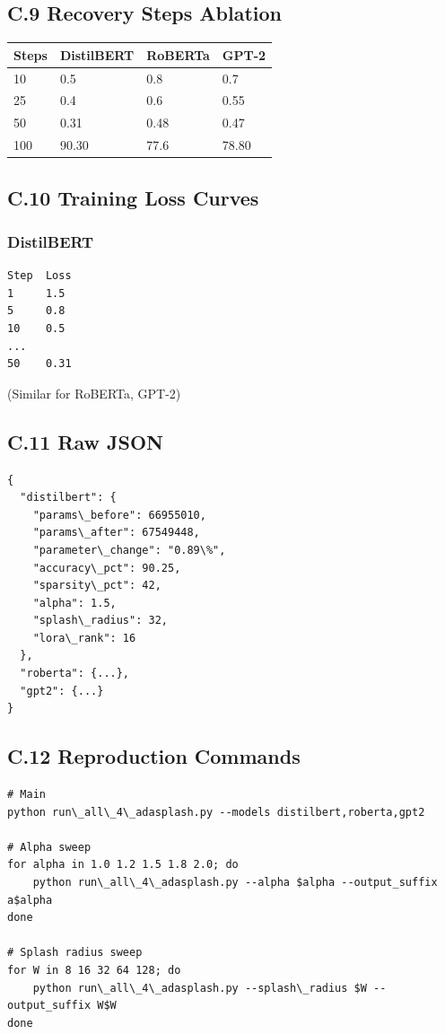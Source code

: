 \subsection{C.9 Recovery Steps Ablation}

\begin{table}[H]
\centering
\small
\begin{tabular}{llll}
\toprule
\textbf{Steps} & \textbf{DistilBERT} & \textbf{RoBERTa} & \textbf{GPT-2} \\
\midrule
10 & 0.5 & 0.8 & 0.7 \\
25 & 0.4 & 0.6 & 0.55 \\
50 & 0.31 & 0.48 & 0.47 \\
100 & 90.30 & 77.6 & 78.80 \\
\bottomrule
\end{tabular}
\end{table}

\subsection{C.10 Training Loss Curves}

\subsubsection{DistilBERT}
\begin{lstlisting}
Step  Loss
1     1.5
5     0.8
10    0.5
...
50    0.31
\end{lstlisting}

(Similar for RoBERTa, GPT-2)

\subsection{C.11 Raw JSON}

\begin{lstlisting}
{
  "distilbert": {
    "params\_before": 66955010,
    "params\_after": 67549448,
    "parameter\_change": "0.89\%",
    "accuracy\_pct": 90.25,
    "sparsity\_pct": 42,
    "alpha": 1.5,
    "splash\_radius": 32,
    "lora\_rank": 16
  },
  "roberta": {...},
  "gpt2": {...}
}
\end{lstlisting}

\subsection{C.12 Reproduction Commands}

\begin{lstlisting}
# Main
python run\_all\_4\_adasplash.py --models distilbert,roberta,gpt2

# Alpha sweep
for alpha in 1.0 1.2 1.5 1.8 2.0; do
    python run\_all\_4\_adasplash.py --alpha $alpha --output_suffix a$alpha
done

# Splash radius sweep
for W in 8 16 32 64 128; do
    python run\_all\_4\_adasplash.py --splash\_radius $W --output_suffix W$W
done
\end{lstlisting}